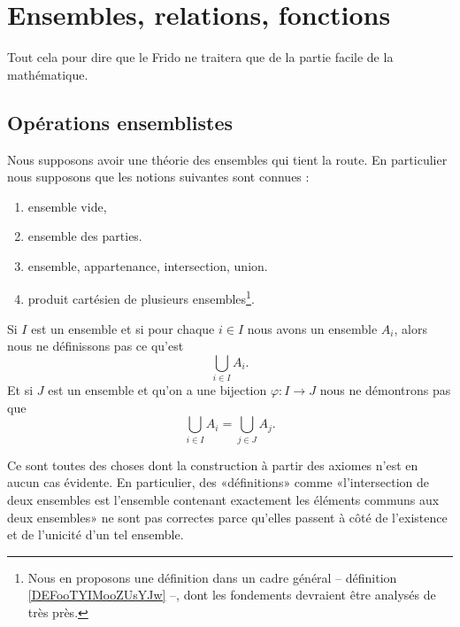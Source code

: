 \section{Ensembles, relations, fonctions}
\label{SECooEltsEnsembles}

\begin{normaltext}	\label{NORMooFridoMathsFaciles}
	Tout cela pour dire que le Frido ne traitera que de la partie facile de la mathématique.
\end{normaltext}

\subsection{Opérations ensemblistes}
\label{SUBooOperationsEnsemblistes}

\begin{normaltext}\label{NorooFridoIntro2}
	Nous supposons avoir une théorie des ensembles qui tient la route. En particulier nous supposons que les notions suivantes sont connues :
	\begin{enumerate}
		\item
		      ensemble vide,
		\item
		      ensemble des parties.
		\item
		      ensemble, appartenance, intersection, union.
		\item
		      produit cartésien de plusieurs ensembles\footnote{Nous en proposons une définition dans un cadre général -- définition \ref{DEFooTYIMooZUsYJw} --, dont les fondements devraient être analysés de très près.}.
	\end{enumerate}

	Si \( I\) est un ensemble et si pour chaque \( i\in I\) nous avons un ensemble \( A_i\), alors nous ne définissons pas ce qu'est
	\begin{equation}
		\bigcup_{i\in I}A_i.
	\end{equation}
	Et si \( J\) est un ensemble et qu'on a une bijection \(\varphi \colon I\to J  \) nous ne démontrons pas que
	\begin{equation}
		\bigcup_{i\in I}A_i=\bigcup_{j\in J}A_j.
	\end{equation}

	Ce sont toutes des choses dont la construction à partir des axiomes n'est en aucun cas évidente. En particulier, des «définitions» comme «l'intersection de deux ensembles est l'ensemble contenant exactement les éléments communs aux deux ensembles» ne sont pas correctes parce qu'elles passent à côté de l'existence et de l'unicité d'un tel ensemble.
\end{normaltext}

